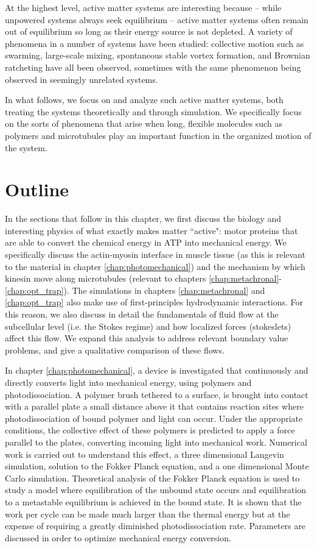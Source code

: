 \documentclass[11pt]{ucthesis}
\begin{document}
At the highest level, active matter systems are interesting because -- while unpowered systems always seek equilibrium -- active matter systems often remain out of equilibrium so long as their energy source is not depleted. A variety of phenomena in a number of systems have been studied: collective motion such as swarming, large-scale mixing, spontaneous stable vortex formation, and Brownian ratcheting have all been observed, sometimes with the same phenomenon being observed in seemingly unrelated systems.

In what follows, we focus on and analyze such active matter systems, both treating the systems theoretically and through simulation. We specifically focus on the sorts of phenomena that arise when long, flexible molecules such as polymers and microtubules play an important function in the organized motion of the system.

\section{Outline}

In the sections that follow in this chapter, we first discuss the biology and interesting physics of what exactly makes matter ``active": motor proteins that are able to convert the chemical energy in ATP into mechanical energy. We specifically discuss the actin-myosin interface in muscle tissue (as this is relevant to the material in chapter \ref{chap:photomechanical}) and the mechanism by which kinesin move along microtubules (relevant to chapters \ref{chap:metachronal}-\ref{chap:opt_trap}). The simulations in chapters \ref{chap:metachronal} and \ref{chap:opt_trap} also make use of first-principles hydrodynamic interactions. For this reason, we also discuss in detail the fundamentals of fluid flow at the subcellular level (i.e. the Stokes regime) and how localized forces (stokeslets) affect this flow. We expand this analysis to address relevant boundary value problems, and give a qualitative comparison of these flows. 

In chapter \ref{chap:photomechanical}, a device is investigated that continuously and directly converts
light into mechanical energy, using polymers and photodissociation.
A polymer brush tethered to a surface, is brought into contact with a parallel
plate a small distance above it that contains reaction sites where
photodissociation of bound polymer and light can occur. Under the
appropriate conditions, the collective effect of these polymers is
predicted to apply a force parallel to the plates, converting
incoming light into mechanical work. Numerical work is carried out
to understand this effect, a three dimensional Langevin simulation,
solution to the Fokker Planck equation, and a one dimensional Monte
Carlo simulation.  Theoretical analysis of the Fokker Planck equation
is used to study a model where equilibration of the unbound state
occurs and equilibration to a metastable equilibrium is achieved
in the bound state. It is shown that the work per cycle can be made
much larger than the thermal energy but at the expense of requiring
a greatly diminished photodissociation rate. Parameters
are discussed in order to optimize mechanical energy conversion.
\end{document}
